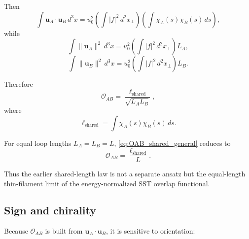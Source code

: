 \documentclass[11pt]{article}
\begin{document}
            Then
            \begin{equation}
                \int \mathbf{u}_A\cdot \mathbf{u}_B\,d^3x
                =
                u_0^2
                \left(\int |f|^2\,d^2x_\perp\right)
                \left(\int \chi_A(s)\chi_B(s)\,ds\right),
            \end{equation}
            while
            \begin{equation}
                \int \|\mathbf{u}_A\|^2\,d^3x
                =
                u_0^2
                \left(\int |f|^2\,d^2x_\perp\right)L_A,
            \end{equation}
            \begin{equation}
                \int \|\mathbf{u}_B\|^2\,d^3x
                =
                u_0^2
                \left(\int |f|^2\,d^2x_\perp\right)L_B.
            \end{equation}
            
            Therefore
            \begin{equation}
                \boxed{
                    \mathcal{O}_{AB}
                    =
                    \frac{\ell_{\mathrm{shared}}}{\sqrt{L_A L_B}},
                }
                \label{eq:OAB_shared_general}
            \end{equation}
            where
            \[
                \ell_{\mathrm{shared}}=\int \chi_A(s)\chi_B(s)\,ds.
            \]
            
            For equal loop lengths \(L_A=L_B=L\), \cref{eq:OAB_shared_general} reduces to
            \begin{equation}
                \boxed{
                    \mathcal{O}_{AB}
                    =
                    \frac{\ell_{\mathrm{shared}}}{L}.
                }
                \label{eq:OAB_shared_equal}
            \end{equation}
            
            Thus the earlier shared-length law is not a separate ansatz but the equal-length thin-filament limit of the energy-normalized SST overlap functional.
        
        \subsection{Sign and chirality}
            
            Because \(\mathcal{O}_{AB}\) is built from \(\mathbf{u}_A\cdot \mathbf{u}_B\), it is sensitive to orientation:
            
\end{document}
